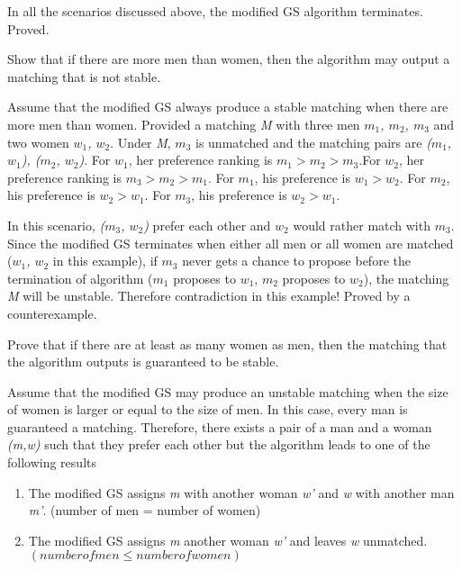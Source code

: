 \documentclass{homework}
\begin{document}
\begin{enumerate}
    In all the scenarios discussed above, the modified GS algorithm terminates. Proved.
    
    
    \question Show that if there are more men than women, then the algorithm may output a matching that is not stable.
    
    Assume that the modified GS always produce a stable matching when there are more men than women. Provided a matching \textit{M} with three men \textit{$m_1$, $m_2$, $m_3$} and two women \textit{$w_1$, $w_2$}. Under \textit{M}, \textit{$m_3$} is unmatched and the matching pairs are \textit{($m_1$, $w_1$), ($m_2$, $w_2$)}.  For \textit{$w_1$}, her preference ranking is \textit{$m_1 > m_2 > m_3$}.For \textit{$w_2$}, her preference ranking is \textit{$m_3 > m_2 > m_1$}. For \textit{$m_1$}, his preference is \textit{$w_1 > w_2$}. For \textit{$m_2$}, his preference is \textit{$w_2 > w_1$}. For \textit{$m_3$}, his preference is \textit{$w_2 > w_1$}.
    
    In this scenario, \textit{($m_3$, $w_2$)} prefer each other and \textit{$w_2$} would rather match with \textit{$m_3$}. Since the modified GS terminates when either all men or all women are matched (\textit{$w_1$, $w_2$} in this example), if \textit{$m_3$} never gets a chance to propose before the termination of algorithm (\textit{$m_1$} proposes to \textit{$w_1$}, \textit{$m_2$} proposes to \textit{$w_2$}), the matching \textit{M} will be unstable. Therefore contradiction in this example! Proved by a counterexample.
    
    \question Prove that if there are at least as many women as men, then the matching that the algorithm outputs is guaranteed to be stable.
    
    Assume that the modified GS may produce an unstable matching when the size of women is larger or equal to the size of men. In this case, every man is guaranteed a matching. Therefore, there exists a pair of a man and a woman \textit{(m,w)} such that they prefer each other but the algorithm leads to one of the following results
    \begin{enumerate}
        \item The modified GS assigns \textit{m} with another woman \textit{w'} and \textit{w} with another man \textit{m'}. (number of men = number of women)
        \item The modified GS assigns \textit{m} another woman \textit{w'} and leaves \textit{w} unmatched. $(number of men \leq number of women)$
    \end{enumerate}
    

\end{enumerate}
\end{document}
